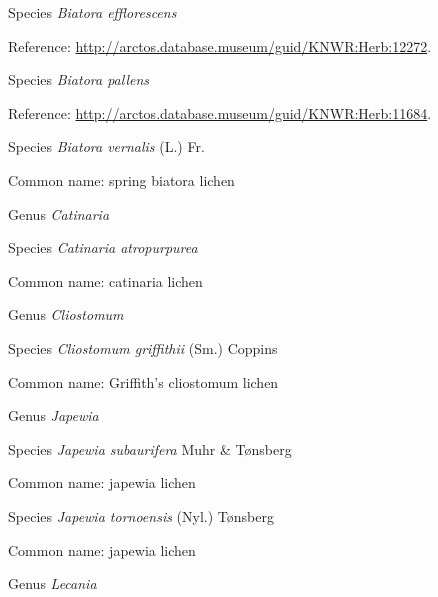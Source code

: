 \documentclass[9pt, article]{memoir}
\begin{document}
\begin{multicols}{2}
\vspace{6pt}\noindent\hspace{36pt}Species \textit{Biatora efflorescens}


Reference: 
\url{http://arctos.database.museum/guid/KNWR:Herb:12272}.

\vspace{6pt}\noindent\hspace{36pt}Species \textit{Biatora pallens}


Reference: 
\url{http://arctos.database.museum/guid/KNWR:Herb:11684}.

\vspace{6pt}\noindent\hspace{36pt}Species \textit{Biatora vernalis} (L.) Fr.


Common name: spring biatora lichen

\vspace{6pt}\noindent\hspace{30pt}Genus \textit{Catinaria}


\vspace{6pt}\noindent\hspace{36pt}Species \textit{Catinaria atropurpurea}


Common name: catinaria lichen

\vspace{6pt}\noindent\hspace{30pt}Genus \textit{Cliostomum}


\vspace{6pt}\noindent\hspace{36pt}Species \textit{Cliostomum griffithii} (Sm.) Coppins


Common name: Griffith's cliostomum lichen

\vspace{6pt}\noindent\hspace{30pt}Genus \textit{Japewia}


\vspace{6pt}\noindent\hspace{36pt}Species \textit{Japewia subaurifera} Muhr \& Tønsberg


Common name: japewia lichen

\vspace{6pt}\noindent\hspace{36pt}Species \textit{Japewia tornoensis} (Nyl.) Tønsberg


Common name: japewia lichen

\vspace{6pt}\noindent\hspace{30pt}Genus \textit{Lecania}



\end{multicols}
\end{document}
